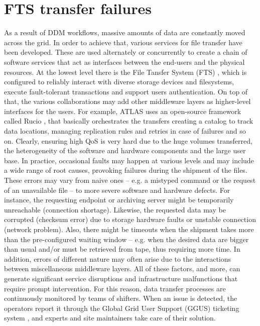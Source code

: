 \section{FTS transfer failures}

As a result of DDM workflows, massive amounts of data are constantly moved across the grid.
In order to achieve that, various services for file transfer have been developed. These are used alternately or concurrently to create a chain of software services that act as interfaces between the end-users and the physical resources.
At the lowest level there is the File Tansfer System (FTS) \cite{karavakis2020fts}, which is configured to reliably interact with diverse storage devices and filesystems, execute fault-tolerant transactions and support users authentication.
On top of that, the various collaborations may add other middleware layers as higher-level interfaces for the users.
For example, ATLAS uses an open-source framework called Rucio \cite{barisits2019rucio}, that basically orchestrates the transfers creating a catalog to track data locations, managing replication rules and retries in case of failures and so on.
Clearly, ensuring high QoS is very hard due to the huge volumes transferred, the heterogeneity of the software and hardware components and the large user base.
In practice, occasional faults may happen at various levels and may include a wide range of root causes, provoking failures during the shipment of the files.
These errors may vary from naive ones -- e.g. a mistyped command or the request of an unavailable file -- to more severe software and hardware defects.
For instance, the requesting endpoint or archiving server might be temporarily unreachable (connection shortage).
Likewise, the requested data may be corrupted (checksum error) due to storage hardware faults or unstable connection (network problem).
Also, there might be timeouts when the shipment takes more than the pre-configured waiting window -- e.g. when the desired data are bigger than usual and/or must be retrieved from tape, thus requiring more time.
In addition, errors of different nature may often arise due to the interactions between miscellaneous middleware layers.
All of these factors, and more, can generate significant service disruptions and infrastructure malfunctions that require prompt intervention.
For this reason, data transfer processes are continuously monitored by teams of shifters. When an issue is detected, the operators report it through the Global Grid User Support (GGUS) ticketing system \cite{antoni2008ggus}, and experts and site maintainers take care of their solution.
